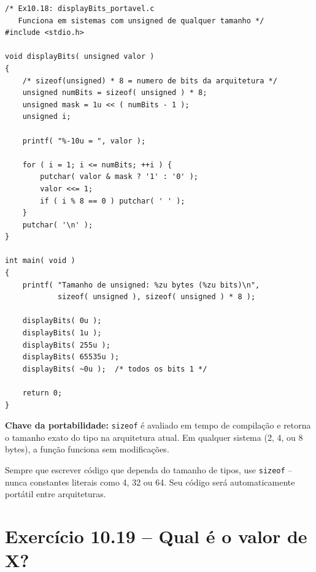 \documentclass[12pt,a4paper]{article}
\begin{document}
\begin{respostabox}
\begin{lstlisting}
/* Ex10.18: displayBits_portavel.c
   Funciona em sistemas com unsigned de qualquer tamanho */
#include <stdio.h>

void displayBits( unsigned valor )
{
    /* sizeof(unsigned) * 8 = numero de bits da arquitetura */
    unsigned numBits = sizeof( unsigned ) * 8;
    unsigned mask = 1u << ( numBits - 1 );
    unsigned i;

    printf( "%-10u = ", valor );

    for ( i = 1; i <= numBits; ++i ) {
        putchar( valor & mask ? '1' : '0' );
        valor <<= 1;
        if ( i % 8 == 0 ) putchar( ' ' );
    }
    putchar( '\n' );
}

int main( void )
{
    printf( "Tamanho de unsigned: %zu bytes (%zu bits)\n",
            sizeof( unsigned ), sizeof( unsigned ) * 8 );

    displayBits( 0u );
    displayBits( 1u );
    displayBits( 255u );
    displayBits( 65535u );
    displayBits( ~0u );  /* todos os bits 1 */

    return 0;
}
\end{lstlisting}

\textbf{Chave da portabilidade:} \texttt{sizeof} é avaliado em tempo de compilação
e retorna o tamanho exato do tipo na arquitetura atual. Em qualquer sistema (2,
4, ou 8 bytes), a função funciona sem modificações.

\begin{boaprática}
  Sempre que escrever código que dependa do tamanho de tipos, use \texttt{sizeof}
  -- nunca constantes literais como 4, 32 ou 64. Seu código será automaticamente
  portátil entre arquiteturas.
\end{boaprática}
\end{respostabox}

\newpage

\section{Exercício 10.19 -- Qual é o valor de X?}
\end{document}
